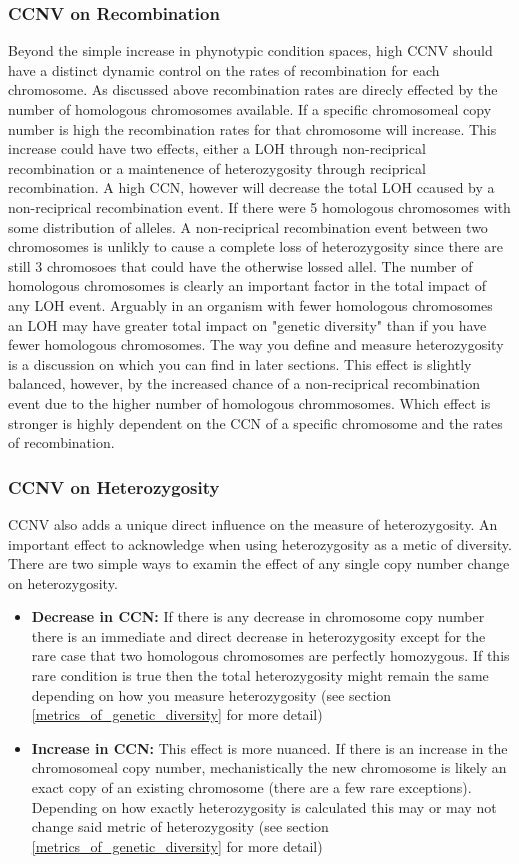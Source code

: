 \documentclass{article}
\begin{document}
    \subsubsection{CCNV on Recombination}
    Beyond the simple increase in phynotypic condition spaces, high CCNV should have a distinct dynamic control on the rates of recombination for each chromosome.  As discussed above recombination rates are direcly effected by the number of homologous chromosomes available.  If a specific chromosomeal copy number is high the recombination rates for that chromosome will increase.  This increase could have two effects, either a LOH through non-reciprical recombination or a maintenence of heterozygosity through reciprical recombination.  A high CCN, however will decrease the total LOH ccaused by a non-reciprical recombination event.   If there were 5 homologous chromosomes with some distribution of alleles.  A non-reciprical recombination event between two chromosomes is unlikly to cause a complete loss of heterozygosity since there are still 3 chromosoes that could have the otherwise lossed allel.  The number of homologous chromosomes is clearly an important factor in the total impact of any LOH event.  Arguably in an organism with fewer homologous chromosomes an LOH may have greater total impact on "genetic diversity" than if you have fewer homologous chromosomes. The way you define and measure heterozygosity is  a discussion on which you can find in later sections.  This effect is slightly balanced, however, by the increased chance of a non-reciprical recombination event due to the higher number of homologous chrommosomes.  Which effect is stronger is highly dependent on the CCN of a specific chromosome and the rates of recombination.

    \subsubsection{CCNV on Heterozygosity}
    CCNV also adds a unique direct influence on the measure of heterozygosity.  An important effect to acknowledge when using heterozygosity as a metic of diversity.  There are two simple ways to examin the effect of any single copy number change on heterozygosity.
    \begin{itemize}
        \item \textbf{Decrease in CCN:} If there is any decrease in chromosome copy number there is an immediate and direct decrease in heterozygosity except for the rare case that two homologous chromosomes are perfectly homozygous.  If this rare condition is true then the total heterozygosity might remain the same depending on how you measure heterozygosity (see section \ref{metrics_of_genetic_diversity} for more detail)
        \item \textbf{Increase in CCN:} This effect is more nuanced.  If there is an increase in the chromosomeal copy number, mechanistically the new chromosome is likely an exact copy of an existing chromosome (there are a few rare exceptions).  Depending on how exactly heterozygosity is calculated this may or may not change said metric of heterozygosity (see section \ref{metrics_of_genetic_diversity} for more detail)
    \end{itemize}
\end{document}
